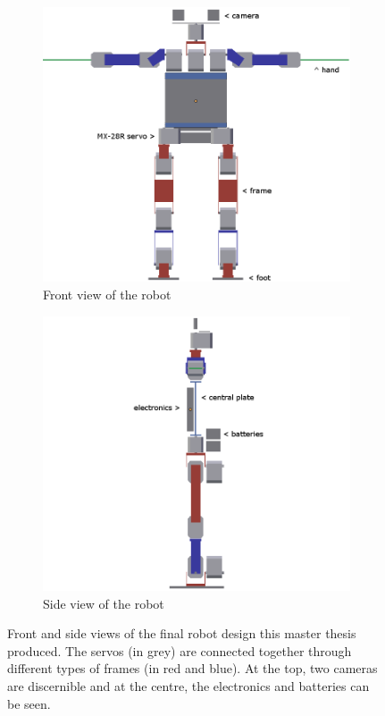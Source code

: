 \begin{figure}[htp]
\center
\begin{subfigure}[b]{0.45\textwidth}
    \includegraphics[width = \textwidth]{figures/robot_v7_front}
    \caption[]{Front view of the robot}
    \label{fig:abstract_robot1}
\end{subfigure}
\hfill
\begin{subfigure}[b]{0.45\textwidth}
\center
    \includegraphics[width = \textwidth]{figures/robot_v7_side}
    \caption[]{Side view of the robot}
    \label{fig:abstract_robot2}
\end{subfigure}
\caption[]{Front and side views of the final robot design this master thesis produced. The servos (in grey) are connected together through different types of frames (in red and blue). At the top, two cameras are discernible and at the centre, the electronics and batteries can be seen.}
\label{fig:abstract2}
\end{figure}